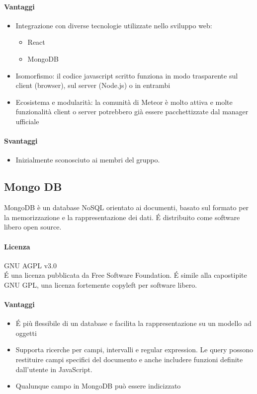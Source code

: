 \paragraph{Vantaggi}
\begin{itemize}
	\item Integrazione con diverse tecnologie utilizzate nello sviluppo web:
	\begin{itemize}
		\item React
		\item MongoDB
	\end{itemize}
	\item Isomorfismo: il codice javascript scritto funziona in modo trasparente sul client (browser), sul server (Node.js) o in entrambi
	\item Ecosistema e modularità: la comunità di Meteor è molto attiva
     e molte funzionalità client o server potrebbero già essere
     pacchettizzate dal  manager ufficiale 
\end{itemize}

\paragraph{Svantaggi} %
\begin{itemize}
	\item Inizialmente sconosciuto ai membri del gruppo.
\end{itemize}

\subsection{Mongo DB}
MongoDB è un database NoSQL orientato ai documenti, basato sul formato  per la memorizzazione e la rappresentazione dei dati. \'E distribuito come software libero open source. \\

\paragraph{Licenza} GNU AGPL v3.0 \\
\'E una licenza pubblicata da Free Software Foundation. \'E simile alla capostipite GNU GPL, una licenza fortemente copyleft per software libero.

\paragraph{Vantaggi}
\begin{itemize}
	\item \'E più flessibile di un database  e facilita la rappresentazione su un modello ad
	oggetti
	\item Supporta ricerche per campi, intervalli e regular expression. Le query possono restituire campi specifici del documento e anche includere funzioni definite dall'utente in JavaScript.
	\item Qualunque campo in MongoDB può essere indicizzato 
\end{itemize}


